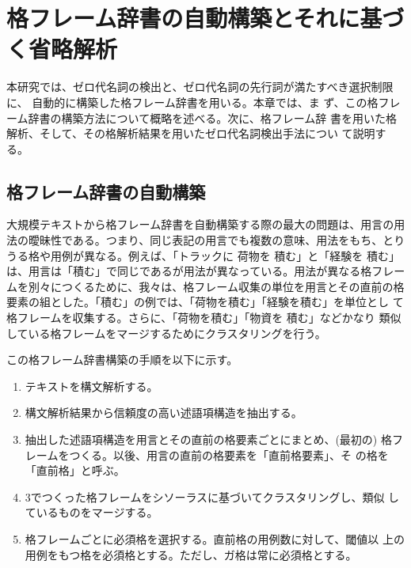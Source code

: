 \documentclass{nlp}
\begin{document}
\section{格フレーム辞書の自動構築とそれに基づく省略解析}

本研究では、ゼロ代名詞の検出と、ゼロ代名詞の先行詞が満たすべき選択制限に、
自動的に構築した格フレーム辞書\cite{Kawahara2002e}を用いる。本章では、ま
ず、この格フレーム辞書の構築方法について概略を述べる。次に、格フレーム辞
書を用いた格解析、そして、その格解析結果を用いたゼロ代名詞検出手法につい
て説明する。


\subsection{格フレーム辞書の自動構築}
\label{Section::格フレーム辞書の自動構築}

大規模テキストから格フレーム辞書を自動構築する際の最大の問題は、用言の用
法の曖昧性である。つまり、同じ表記の用言でも複数の意味、用法をもち、とり
うる格や用例が異なる。例えば、「トラックに 荷物を 積む」と「経験を 積む」
は、用言は「積む」で同じであるが用法が異なっている。用法が異なる格フレー
ムを別々につくるために、我々は、格フレーム収集の単位を用言とその直前の格
要素の組とした。「積む」の例では、「荷物を積む」「経験を積む」を単位とし
て格フレームを収集する。さらに、「荷物を積む」「物資を 積む」などかなり
類似している格フレームをマージするためにクラスタリングを行う。

この格フレーム辞書構築の手順を以下に示す。

\begin{enumerate}
 \item テキストを構文解析する。
 \item 構文解析結果から信頼度の高い述語項構造を抽出する。
 \item 抽出した述語項構造を用言とその直前の格要素ごとにまとめ、(最初の) 
       格フレームをつくる。以後、用言の直前の格要素を「直前格要素」、そ
       の格を「直前格」と呼ぶ。
 \item 3でつくった格フレームをシソーラスに基づいてクラスタリングし、類似
       しているものをマージする。
 \item 格フレームごとに必須格を選択する。直前格の用例数に対して、閾値以
       上の用例をもつ格を必須格とする。ただし、ガ格は常に必須格とする。
\end{enumerate}

\vspace*{2ex}
\end{document}
